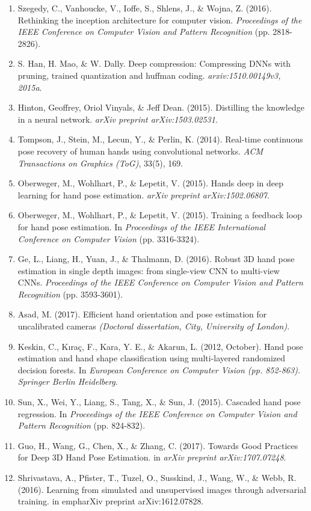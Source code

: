 \documentclass{article}
\begin{document}
\begin{enumerate}
\item Szegedy, C., Vanhoucke, V., Ioffe, S., Shlens, J., \& Wojna, Z. (2016). Rethinking the inception architecture for computer vision. \emph{Proceedings of the IEEE Conference on Computer Vision and Pattern Recognition} (pp. 2818-2826).
\item S. Han, H. Mao, \& W. Dally. Deep compression: Compressing DNNs with pruning, trained
quantization and huffman coding. \emph{arxiv:1510.00149v3, 2015a}.
\item Hinton, Geoffrey, Oriol Vinyals, \& Jeff Dean.  (2015). Distilling the knowledge in a neural network. \emph{arXiv preprint arXiv:1503.02531}.
\item Tompson, J., Stein, M., Lecun, Y., \& Perlin, K. (2014). Real-time continuous pose recovery of human hands using convolutional networks. \emph{ACM Transactions on Graphics (ToG)}, 33(5), 169.
\item Oberweger, M., Wohlhart, P., \& Lepetit, V. (2015). Hands deep in deep learning for hand pose estimation. \emph{arXiv preprint arXiv:1502.06807}.
\item Oberweger, M., Wohlhart, P., \& Lepetit, V. (2015). Training a feedback loop for hand pose estimation. In \emph{Proceedings of the IEEE International Conference on Computer Vision} (pp. 3316-3324).
\item Ge, L., Liang, H., Yuan, J., \& Thalmann, D. (2016). Robust 3D hand pose estimation in single depth images: from single-view CNN to multi-view CNNs. \emph{Proceedings of the IEEE Conference on Computer Vision and Pattern Recognition} (pp. 3593-3601).
\item Asad, M. (2017). Efficient hand orientation and pose estimation for uncalibrated cameras \emph{(Doctoral dissertation, City, University of London)}.
\item Keskin, C., Kıraç, F., Kara, Y. E., \& Akarun, L. (2012, October). Hand pose estimation and hand shape classification using multi-layered randomized decision forests. In \emph{European Conference on Computer Vision (pp. 852-863). Springer Berlin Heidelberg}.
\item Sun, X., Wei, Y., Liang, S., Tang, X., \& Sun, J. (2015). Cascaded hand pose regression. In \emph{Proceedings of the IEEE Conference on Computer Vision and Pattern Recognition} (pp. 824-832).
\item Guo, H., Wang, G., Chen, X., \& Zhang, C. (2017). Towards Good Practices for Deep 3D Hand Pose Estimation. in \emph{arXiv preprint arXiv:1707.07248}.
\item Shrivastava, A., Pfister, T., Tuzel, O., Susskind, J., Wang, W., \& Webb, R. (2016). Learning from simulated and unsupervised images through adversarial training. in emph{arXiv preprint arXiv:1612.07828}.

\end{enumerate}
\end{document}
